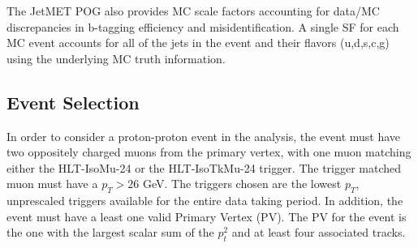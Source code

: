 The JetMET POG also provides MC scale factors accounting for data/MC discrepancies in b-tagging efficiency and misidentification. A single SF for each MC event accounts for all of the jets in the event and their flavors (u,d,s,c,g) using the underlying MC truth information. 

\subsection{Event Selection}

In order to consider a proton-proton event in the analysis, the event must have two oppositely charged muons from the primary vertex, with one muon matching either the HLT-IsoMu-24 or the HLT-IsoTkMu-24 trigger. The trigger matched muon must have a $p_T > 26$ GeV. The triggers chosen are the lowest $p_T$, unprescaled triggers available for the entire data taking period. In addition, the event must have a least one valid Primary Vertex (PV). The PV for the event is the one with the largest scalar sum of the $p^2_t$ and at least four associated tracks.  
